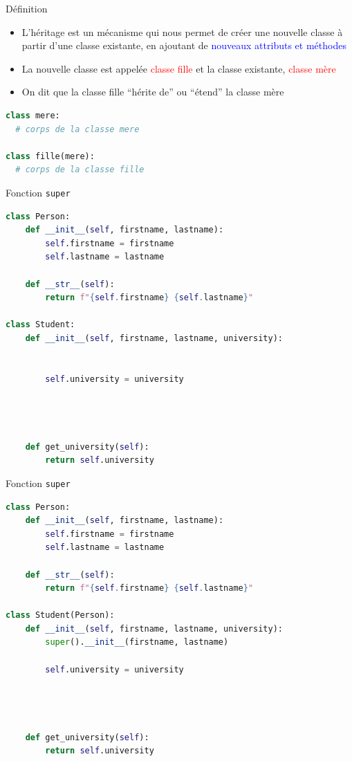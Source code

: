 \documentclass[10pt]{beamer}
\begin{document}
\begin{frame}[fragile]{Définition}

  \begin{itemize}
    \item L'héritage est un mécanisme qui nous permet de créer une nouvelle classe à partir d'une classe existante, en ajoutant de \textcolor{blue}{nouveaux attributs et méthodes}
    \item La nouvelle classe est appelée \textcolor{red}{classe fille} et la classe existante, \textcolor{red}{classe mère}
    \item On dit que la classe fille ``hérite de'' ou  ``étend'' la classe mère
  \end{itemize}

\begin{lstlisting}[language=python, numbers=none]
class mere:
  # corps de la classe mere

class fille(mere):
  # corps de la classe fille
\end{lstlisting}

\end{frame}

\begin{frame}[fragile]{Fonction \texttt{super}}
\begin{lstlisting}[language=python, numbers=none]
class Person:
    def __init__(self, firstname, lastname):
        self.firstname = firstname
        self.lastname = lastname

    def __str__(self):
        return f"{self.firstname} {self.lastname}"

class Student:
    def __init__(self, firstname, lastname, university):


        self.university = university        
    



    def get_university(self):
        return self.university
\end{lstlisting}
  \end{frame}



\begin{frame}[fragile]{Fonction \texttt{super}}
\begin{lstlisting}[language=python, numbers=none, morekeywords={super}]
class Person:
    def __init__(self, firstname, lastname):
        self.firstname = firstname
        self.lastname = lastname

    def __str__(self):
        return f"{self.firstname} {self.lastname}"

class Student(Person):
    def __init__(self, firstname, lastname, university):
        super().__init__(firstname, lastname)

        self.university = university        
    



    def get_university(self):
        return self.university
\end{lstlisting}
  \end{frame}
\end{document}

